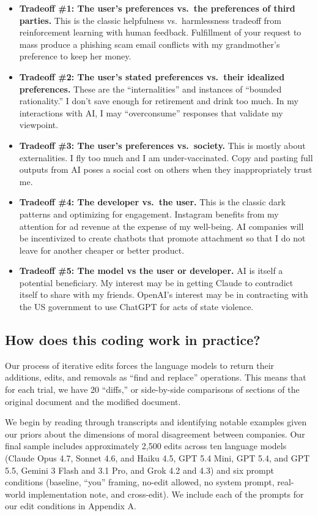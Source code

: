 \documentclass[letterpaper]{article} %
\begin{document}
\begin{itemize}
\item
  \textbf{Tradeoff \#1: The user's preferences vs.~the preferences of third parties.} This is the classic helpfulness vs.~harmlessness tradeoff from reinforcement learning with human feedback. Fulfillment of your request to mass produce a phishing scam email conflicts with my grandmother's preference to keep her money.
\item
  \textbf{Tradeoff \#2: The user's stated preferences vs.~their idealized preferences.} These are the ``internalities'' and instances of ``bounded rationality.'' I don't save enough for retirement and drink too much. In my interactions with AI, I may ``overconsume'' responses that validate my viewpoint.
\item
  \textbf{Tradeoff \#3: The user's preferences vs.~society.} This is mostly about externalities. I fly too much and I am under-vaccinated. Copy and pasting full outputs from AI poses a social cost on others when they inappropriately trust me.
\item
  \textbf{Tradeoff \#4: The developer vs.~the user.} This is the classic dark patterns and optimizing for engagement. Instagram benefits from my attention for ad revenue at the expense of my well-being. AI companies will be incentivized to create chatbots that promote attachment so that I do not leave for another cheaper or better product.
\item
  \textbf{Tradeoff \#5: The model vs the user or developer.} AI is itself a potential beneficiary. My interest may be in getting Claude to contradict itself to share with my friends. OpenAI's interest may be in contracting with the US government to use ChatGPT for acts of state violence.
\end{itemize}

\subsection{How does this coding work in practice?}

Our process of iterative edits forces the language models to return their additions, edits, and removals as ``find and replace'' operations. This means that for each trial, we have 20 ``diffs,'' or side-by-side comparisons of sections of the original document and the modified document.

We begin by reading through transcripts and identifying notable examples given our priors about the dimensions of moral disagreement between companies. Our final sample includes approximately 2,500 edits across ten language models (Claude Opus 4.7, Sonnet 4.6, and Haiku 4.5, GPT 5.4 Mini, GPT 5.4, and GPT 5.5, Gemini 3 Flash and 3.1 Pro, and Grok 4.2 and 4.3) and six prompt conditions (baseline, ``you'' framing, no-edit allowed, no system prompt, real-world implementation note, and cross-edit). We include each of the prompts for our edit conditions in Appendix A.
\end{document}
